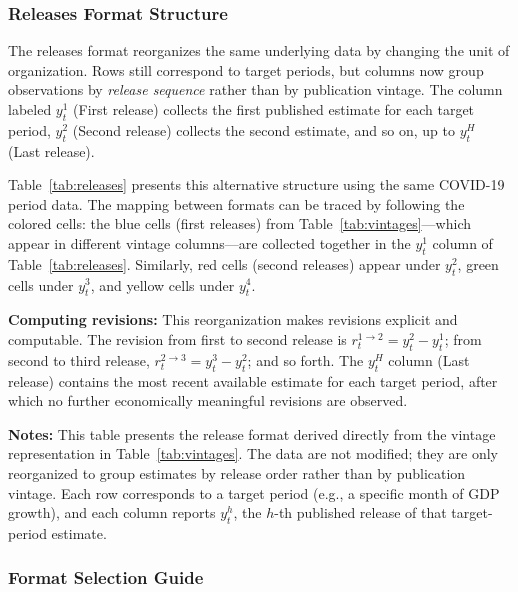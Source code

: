 \documentclass[12pt]{article}
\begin{document}
\subsubsection*{Releases Format Structure}

The releases format reorganizes the same underlying data by changing the unit of organization. Rows still correspond to target periods, but columns now group observations by \emph{release sequence} rather than by publication vintage. The column labeled $y_t^1$ (First release) collects the first published estimate for each target period, $y_t^2$ (Second release) collects the second estimate, and so on, up to $y_t^H$ (Last release).

Table~\ref{tab:releases} presents this alternative structure using the same COVID-19 period data. The mapping between formats can be traced by following the colored cells: the blue cells (first releases) from Table~\ref{tab:vintages}---which appear in different vintage columns---are collected together in the $y_t^1$ column of Table~\ref{tab:releases}. Similarly, red cells (second releases) appear under $y_t^2$, green cells under $y_t^3$, and yellow cells under $y_t^4$.

\textbf{Computing revisions:} This reorganization makes revisions explicit and computable. The revision from first to second release is $r_t^{1 \rightarrow 2} = y_t^2 - y_t^1$; from second to third release, $r_t^{2 \rightarrow 3} = y_t^3 - y_t^2$; and so forth. The $y_t^H$ column (Last release) contains the most recent available estimate for each target period, after which no further economically meaningful revisions are observed.

\begin{table}[!b]
\caption{Dataset of monthly releases (illustrative excerpt)}
\label{tab:releases}

\centering
\resizebox{\textwidth}{!}{%

}

\medskip
\footnotesize
\textbf{Notes:} This table presents the release format derived directly from the vintage representation in Table~\ref{tab:vintages}. The data are not modified; they are only reorganized to group estimates by release order rather than by publication vintage. Each row corresponds to a target period (e.g., a specific month of GDP growth), and each column reports $y_t^h$, the $h$-th published release of that target-period estimate.
\end{table}

\subsubsection*{Format Selection Guide}
\end{document}

